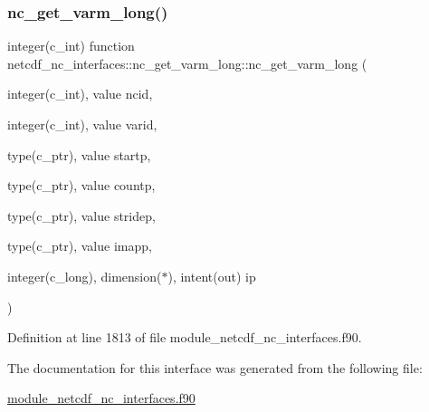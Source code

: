 \subsubsection{\texorpdfstring{nc\+\_\+get\+\_\+varm\+\_\+long()}{nc\_get\_varm\_long()}}
{\footnotesize\ttfamily integer(c\+\_\+int) function netcdf\+\_\+nc\+\_\+interfaces\+::nc\+\_\+get\+\_\+varm\+\_\+long\+::nc\+\_\+get\+\_\+varm\+\_\+long (\begin{DoxyParamCaption}\item[{integer(c\+\_\+int), value}]{ncid,  }\item[{integer(c\+\_\+int), value}]{varid,  }\item[{type(c\+\_\+ptr), value}]{startp,  }\item[{type(c\+\_\+ptr), value}]{countp,  }\item[{type(c\+\_\+ptr), value}]{stridep,  }\item[{type(c\+\_\+ptr), value}]{imapp,  }\item[{integer(c\+\_\+long), dimension($\ast$), intent(out)}]{ip }\end{DoxyParamCaption})}



Definition at line 1813 of file module\+\_\+netcdf\+\_\+nc\+\_\+interfaces.\+f90.



The documentation for this interface was generated from the following file\+:\begin{DoxyCompactItemize}
\item 
\hyperlink{module__netcdf__nc__interfaces_8f90}{module\+\_\+netcdf\+\_\+nc\+\_\+interfaces.\+f90}\end{DoxyCompactItemize}
